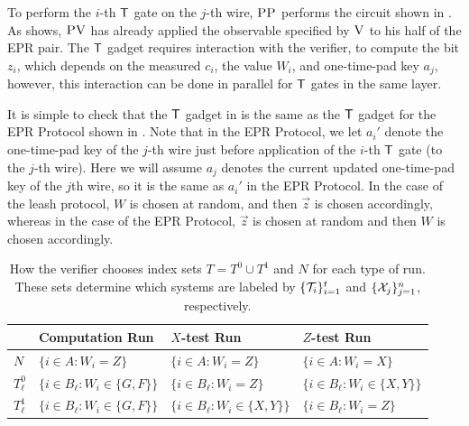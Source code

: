\documentclass{toc}
\newcommand{\ver}{\textsc{V}}
\newcommand{\pv}{\textsc{PV}}
\newcommand{\pp}{\textsc{PP}}
\begin{document}
To perform the $i$-th $\sf T$ gate on the $j$-th wire, $\pp$ performs the circuit shown in . As  shows, $\pv$ has already applied the observable specified by $\ver$ to his half of the EPR pair. The $\sf T$ gadget requires interaction with the verifier, to compute the bit $z_i$, which depends on the measured $c_i$, the value $W_i$, and one-time-pad key $a_j$, however, this interaction can be done in parallel for $\sf T$ gates in the same layer. 


It is simple to check that the $\sf T$ gadget in  is the same as the $\sf T$ gadget for the EPR Protocol shown in . Note that in the EPR Protocol, we let $a_i'$ denote the one-time-pad key of the $j$-th wire just before application of the $i$-th $\sf T$ gate (to the $j$-th wire). Here we will assume $a_j$ denotes the current updated one-time-pad key of the $j$th wire, so it is the same as $a_i'$ in the EPR Protocol. In the case of the leash protocol, $W$ is chosen at random, and then $\vec{z}$ is chosen accordingly, whereas in the case of the EPR Protocol, $\vec{z}$ is chosen at random and then $W$ is chosen accordingly. 




\begin{table}[H]
\centering
\setlength\tabcolsep{1.5pt}
\begin{tabular}{|l|lll|}
\hline
& Computation Run & $X$-test Run & $Z$-test Run\\
\hline
$N$ & $\{i\in A:W_i=Z\}$ & $\{i\in A:W_i=Z\}$ & $\{i\in A:W_i=X\}$\\
$T^0_{\ell}$ & $\{i\in B_{\ell}:W_i\in \{G,F\}\}$ & $\{i\in B_{\ell}:W_i=Z\}$ & $\{i\in B_{\ell}:W_i\in \{X,Y\}\}$ \\
$T^1_{\ell}$ & $\{i\in B_{\ell}:W_i\in \{G,F\}\}$ & $\{i\in B_{\ell}:W_i\in \{X,Y\}\}$ & $\{i\in B_{\ell}:W_i=Z\}$ \\
\hline
\end{tabular}
\caption{How the verifier chooses index sets $T=T^0\cup T^1$ and $N$ for each type of run. These sets determine which systems are labeled by $\{{\cal T}_{i}\}_{i=1}^t$ and $\{{\cal X}_{j}\}_{j=1}^n$, respectively.
%
%
%
}   %
\label{tab:index-choices}
\end{table}
\end{document}
